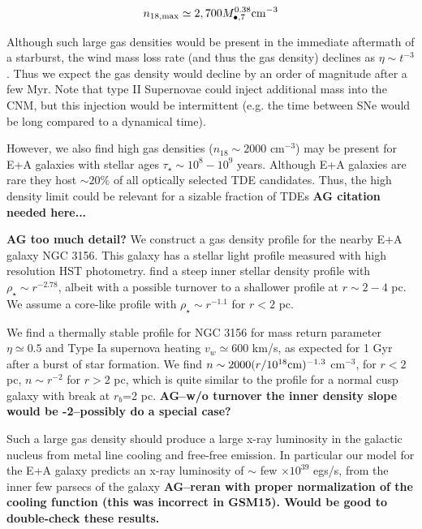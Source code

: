 \documentclass[usenatbib,fleqn]{mnras}
\newcommand{\Mbh}[1][]{M_{\bullet#1}}
\begin{document}
\begin{equation}
n_{\rm 18,max} \simeq 2,700 \Mbh[,7]^{0.38} {\rm cm^{-3}}
\label{eq:n18max}
\end{equation}

Although such large gas densities would be present in the immediate
aftermath of a starburst, the wind mass loss rate (and thus the gas
density) declines as $\eta \sim t^{-3}$. Thus we expect the gas density would
decline by an order of magnitude after a few Myr. Note that type II
Supernovae could inject additional mass into the CNM, but this
injection would be intermittent (e.g. the time between SNe would be
long compared to a dynamical time).

However, we also find high gas densities ($n_{18}\sim 2000$ cm$^{-3}$)
may be present for E+A galaxies with stellar ages $\tau_\star\sim
10^8-10^9$ years. Although E+A galaxies are rare they host $\sim 20
\%$ of all optically selected TDE candidates. Thus, the high density
limit could be relevant for a sizable fraction of TDEs {\bf AG citation
  needed here...}

{\bf AG too much detail?} We construct a gas density profile for the
nearby E+A galaxy NGC 3156. This galaxy has a stellar light profile
measured with high resolution HST photometry. \citealt{Krajnovic+2013}
find a steep inner stellar density profile with $\rho_\star\sim
r^{-2.78}$, albeit with a possible turnover to a shallower profile at
$r \sim 2-4$ pc. We assume a core-like profile with $\rho_\star \sim
r^{-1.1}$ for $r<2$ pc.

We find a thermally stable profile for NGC 3156 for mass
return parameter $\eta\simeq0.5$ and Type Ia supernova heating
$v_w\simeq600 $ km/s, as expected for 1 Gyr after a burst of star
formation. We find $n \sim 2000 (r/10^{18} {\rm cm})^{-1.3}$
cm$^{-3}$, for $r<2$ pc, $n\sim r^{-2}$ for $r>2$ pc, which is quite
similar to the profile for a normal cusp galaxy with break at $r_b$=2
pc. {\bf AG--w/o turnover the inner density slope would be -2--possibly
do a special case?}

Such a large gas density should produce a large x-ray luminosity in
the galactic nucleus from metal line cooling and free-free emission.
In particular our model for the E+A galaxy predicts an x-ray
luminosity of $\sim$ few $\times 10^{39}$ egs/s, from the inner few
parsecs of the galaxy {\bf AG--reran with proper normalization of the
  cooling function (this was incorrect in GSM15). Would be good to
  double-check these results.}
\end{document}
